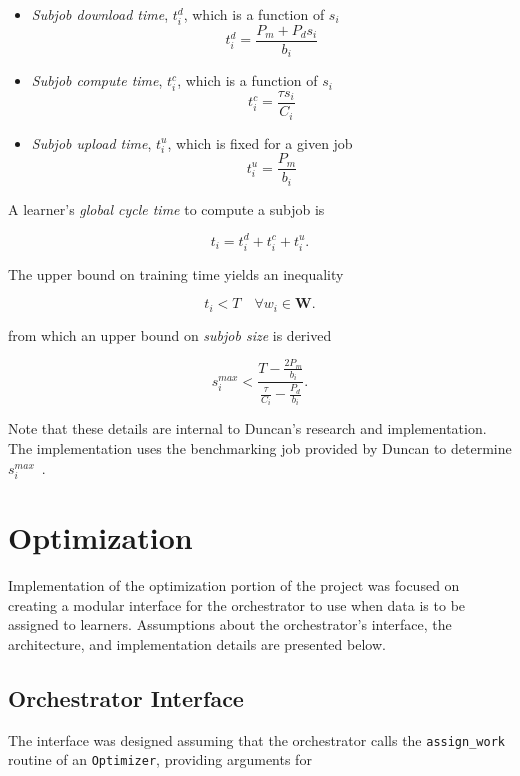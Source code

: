 \documentclass[../mthe-493-final-project.tex]{subfiles}
\begin{document}
    \begin{itemize}
        \item \textit{Subjob download time}, $t^d_i$, which is a function of $s_i$
              \[t^d_i = \frac{P_m + P_d s_i}{b_i}\]
        \item \textit{Subjob compute time}, $t^c_i$, which is a function of $s_i$
              \[t^c_i = \frac{\tau s_i}{C_i}\]
        \item \textit{Subjob upload time}, $t^u_i$, which is fixed for a given job
              \[t^u_i = \frac{P_m}{b_i}\]
    \end{itemize}

    A learner's \textit{global cycle time} to compute a subjob is

    \[t_i = t^d_i + t^c_i + t^u_i.\]

    The upper bound on training time yields an inequality

    \[t_i < T \quad \forall w_i \in \mathbf{W}.\]

    from which an upper bound on \textit{subjob size} is derived

    \[s^{max}_i < \frac{T - \frac{2 P_m}{b_i}}{\frac{\tau}{C_i} - \frac{P_d}{b_i}}.\]

    Note that these details are internal to Duncan's research and implementation. The implementation uses the benchmarking job provided by Duncan to determine $s^{max}_i$~\cite{Mays_Benchmarking}\cite{group_a2_Optimization_Of_Data}.
    
    \section{Optimization}
    \label{sec:optimization-implementation}
    
    Implementation of the optimization portion of the project was focused on creating a modular interface for the orchestrator to use when data is to be assigned to learners. Assumptions about the orchestrator's interface, the architecture, and implementation details are presented below.
    
    \subsection{Orchestrator Interface}
    \label{ssec:optimization-orchestrator-interface}
    
    The interface was designed assuming that the orchestrator calls the \texttt{assign\_work} routine of an \texttt{Optimizer}, providing arguments for
    
\end{document}
